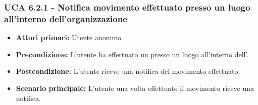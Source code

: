 \subsubsection{UCA 6.2.1 - Notifica movimento effettuato presso un luogo all'interno dell'organizzazione}
\begin{itemize}
	\item \textbf{Attori primari:} Utente anonimo
	\item \textbf{Precondizione:} L'utente ha effettuato un  presso un luogo all'interno dell'.
	\item \textbf{Postcondizione:} L'utente riceve una notifica del movimento effettuato.
	\item \textbf{Scenario principale:} L'utente una volta effettuato il movimento riceve una notifica.
\end{itemize}














